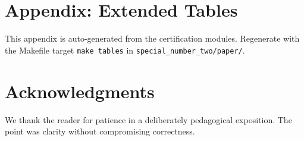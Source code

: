 \documentclass[11pt,a4paper]{article}
\numberwithin{equation}{section}
\numberwithin{figure}{section}
\numberwithin{table}{section}
\theoremstyle{plain}
\theoremstyle{definition}
\theoremstyle{remark}
\begin{document}
\section{Appendix: Extended Tables}
This appendix is auto-generated from the certification modules. Regenerate with the Makefile target \texttt{make tables} in \texttt{special\_number\_two/paper/}.



\section*{Acknowledgments}
We thank the reader for patience in a deliberately pedagogical exposition. The point was clarity without compromising correctness.
\end{document}

